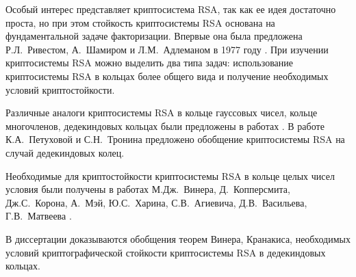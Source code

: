 \documentclass[_00_dissertation.tex]{subfiles}
\begin{document}
Особый интерес представляет криптосистема RSA, так как ее идея достаточно проста, но при этом стойкость криптосистемы RSA основана на фундаментальной задаче факторизации.
Впервые она была предложена Р.Л.~Ривестом, А.~Шамиром и Л.М.~Адлеманом в 1977 году \cite{source:Rivest}.
При изучении криптосистемы RSA можно выделить два типа задач: использование криптосистемы RSA в кольцах более общего вида и получение необходимых условий криптостойкости.

Различные аналоги криптосистемы RSA в кольце гауссовых чисел, кольце многочленов, дедекиндовых кольцах были предложены в работах \cite{source:El_Kassar, source:Elkamchouchi, source:Koval, source:Li}.
В работе К.А.~Петуховой и С.Н.~Тронина \cite{source:Petukhova} предложено обобщение криптосистемы RSA на случай дедекиндовых колец.

Необходимые для криптостойкости криптосистемы RSA в кольце целых чисел условия были получены в работах М.Дж.~Винера, Д.~Копперсмита, Дж.С.~Корона, А.~Мэй, Ю.С.~Харина, С.В.~Агиевича, Д.В.~Васильева, Г.В.~Матвеева \cite{source:Matveev_2019, source:Matveev_2018, source:Kharin, source:Coppersmith, source:Coron, source:Wiener}.

В диссертации доказываются обобщения теорем Винера, Кранакиса, необходимых условий криптографической стойкости криптосистемы RSA в дедекиндовых кольцах.

\onlyinsubfile{
    
}
\end{document}
